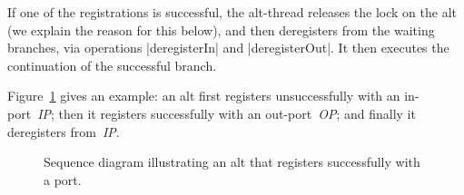 If one of the registrations is successful, the alt-thread releases the lock on
the alt (we explain the reason for this below), and then deregisters from the
waiting branches, via operations |deregisterIn| and |deregisterOut|.  It then
executes the continuation of the successful branch.

\def\IP{\emph{IP}}
\def\OP{\emph{OP}}

Figure~\ref{fig:alt-1} gives an example: an alt first registers unsuccessfully
with an in-port~\IP; then it registers successfully with an out-port~\OP; and
finally it deregisters from~\IP.


\begin{figure}
\begin{center}
\def\height{7.5} %
\def\gap{3.5} %
\end{center}
\caption{Sequence diagram illustrating an alt that registers successfully with
  a port. \label{fig:alt-1}}
\end{figure}


